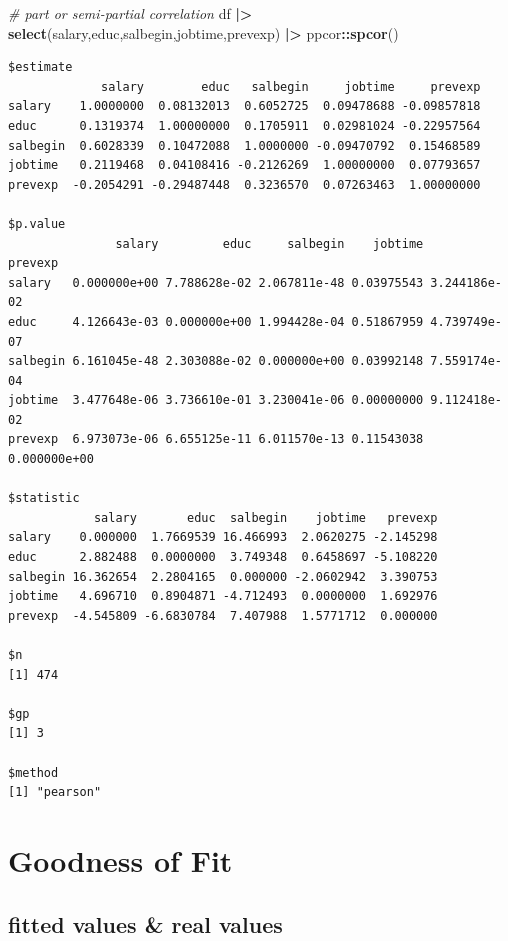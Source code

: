 \documentclass[
]{ctexart}
\newenvironment{Shaded}{\begin{snugshade}}{\end{snugshade}}
\newcommand{\CommentTok}[1]{\textcolor[rgb]{0.56,0.35,0.01}{\textit{#1}}}
\newcommand{\FunctionTok}[1]{\textcolor[rgb]{0.13,0.29,0.53}{\textbf{#1}}}
\newcommand{\NormalTok}[1]{#1}
\newcommand{\SpecialCharTok}[1]{\textcolor[rgb]{0.81,0.36,0.00}{\textbf{#1}}}
\begin{document}
\begin{Shaded}
\begin{Highlighting}[]
\CommentTok{\# part or semi{-}partial correlation}
\NormalTok{df }\SpecialCharTok{|\textgreater{}} \FunctionTok{select}\NormalTok{(salary,educ,salbegin,jobtime,prevexp) }\SpecialCharTok{|\textgreater{}} 
\NormalTok{  ppcor}\SpecialCharTok{::}\FunctionTok{spcor}\NormalTok{()}
\end{Highlighting}
\end{Shaded}

\begin{verbatim}
$estimate
             salary        educ   salbegin     jobtime     prevexp
salary    1.0000000  0.08132013  0.6052725  0.09478688 -0.09857818
educ      0.1319374  1.00000000  0.1705911  0.02981024 -0.22957564
salbegin  0.6028339  0.10472088  1.0000000 -0.09470792  0.15468589
jobtime   0.2119468  0.04108416 -0.2126269  1.00000000  0.07793657
prevexp  -0.2054291 -0.29487448  0.3236570  0.07263463  1.00000000

$p.value
               salary         educ     salbegin    jobtime      prevexp
salary   0.000000e+00 7.788628e-02 2.067811e-48 0.03975543 3.244186e-02
educ     4.126643e-03 0.000000e+00 1.994428e-04 0.51867959 4.739749e-07
salbegin 6.161045e-48 2.303088e-02 0.000000e+00 0.03992148 7.559174e-04
jobtime  3.477648e-06 3.736610e-01 3.230041e-06 0.00000000 9.112418e-02
prevexp  6.973073e-06 6.655125e-11 6.011570e-13 0.11543038 0.000000e+00

$statistic
            salary       educ  salbegin    jobtime   prevexp
salary    0.000000  1.7669539 16.466993  2.0620275 -2.145298
educ      2.882488  0.0000000  3.749348  0.6458697 -5.108220
salbegin 16.362654  2.2804165  0.000000 -2.0602942  3.390753
jobtime   4.696710  0.8904871 -4.712493  0.0000000  1.692976
prevexp  -4.545809 -6.6830784  7.407988  1.5771712  0.000000

$n
[1] 474

$gp
[1] 3

$method
[1] "pearson"
\end{verbatim}

\hypertarget{goodness-of-fit}{%
\section{Goodness of Fit}\label{goodness-of-fit}}

\hypertarget{fitted-values-real-values}{%
\subsection{fitted values \& real
values}\label{fitted-values-real-values}}
\end{document}
